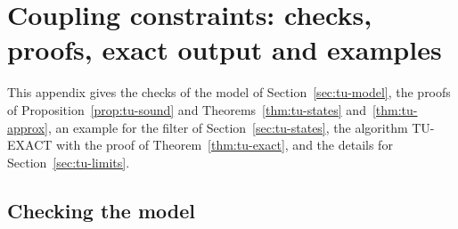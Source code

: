 \section{Coupling constraints: checks, proofs, exact output and examples}\label{app:tu}

This appendix gives the checks of the model of Section~\ref{sec:tu-model},
the proofs of Proposition~\ref{prop:tu-sound} and
Theorems~\ref{thm:tu-states} and~\ref{thm:tu-approx}, an
example for the filter of Section~\ref{sec:tu-states}, the algorithm TU-EXACT
with the proof of Theorem~\ref{thm:tu-exact}, and the details for
Section~\ref{sec:tu-limits}.

\subsection{Checking the model}\label{app:tu-model}

